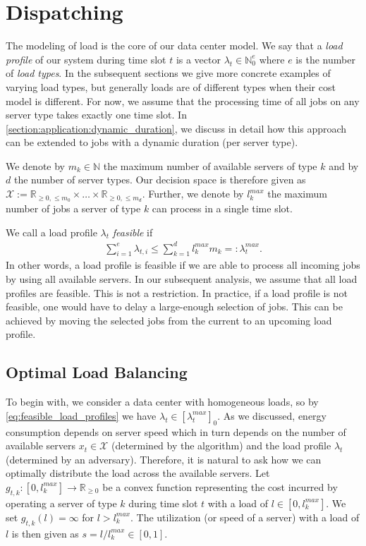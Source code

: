 \section{Dispatching}\label{section:application:dispatching}

The modeling of load is the core of our data center model. We say that a \textit{load profile} of our system during time slot $t$ is a vector $\lambda_t \in \mathbb{N}_0^e$ where $e$ is the number of \textit{load types}. In the subsequent sections we give more concrete examples of varying load types, but generally loads are of different types when their cost model is different. For now, we assume that the processing time of all jobs on any server type takes exactly one time slot. In \autoref{section:application:dynamic_duration}, we discuss in detail how this approach can be extended to jobs with a dynamic duration (per server type).

We denote by $m_k \in \mathbb{N}$ the maximum number of available servers of type $k$ and by $d$ the number of server types. Our decision space is therefore given as $\mathcal{X} := \mathbb{R}_{\geq 0, \leq m_0} \times \dots \times \mathbb{R}_{\geq 0, \leq m_d}$. Further, we denote by $l_k^{max}$ the maximum number of jobs a server of type $k$ can process in a single time slot.

We call a load profile $\lambda_t$ \textit{feasible} if \begin{align}
    \sum_{i=1}^e \lambda_{t,i} \leq \sum_{k=1}^d l_k^{max} m_k =: \lambda_t^{max}.
\label{eq:feasible_load_profiles}
\end{align} In other words, a load profile is feasible if we are able to process all incoming jobs by using all available servers. In our subsequent analysis, we assume that all load profiles are feasible. This is not a restriction. In practice, if a load profile is not feasible, one would have to delay a large-enough selection of jobs. This can be achieved by moving the selected jobs from the current to an upcoming load profile.

\subsection{Optimal Load Balancing}\label{section:application:dispatching:optimal_load_balancing}

To begin with, we consider a data center with homogeneous loads, so by \autoref{eq:feasible_load_profiles} we have $\lambda_t \in [\lambda_t^{max}]_0$. As we discussed, energy consumption depends on server speed which in turn depends on the number of available servers $x_t \in \mathcal{X}$ (determined by the algorithm) and the load profile $\lambda_t$ (determined by an adversary). Therefore, it is natural to ask how we can optimally distribute the load across the available servers. Let $g_{t,k} : [0,l_k^{max}] \to \mathbb{R}_{\geq 0}$ be a convex function representing the cost incurred by operating a server of type $k$ during time slot $t$ with a load of $l \in [0,l_k^{max}]$. We set $g_{t,k}(l) = \infty$ for $l > l_k^{max}$. The utilization (or speed of a server) with a load of $l$ is then given as $s = l / l_k^{max} \in [0,1]$.

